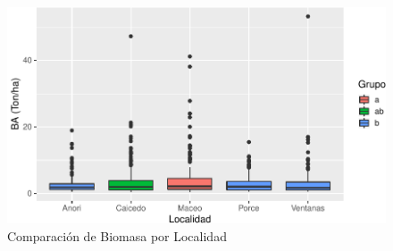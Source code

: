 \documentclass[9pt,onecolumn,twoside,]{pinp}
\begin{document}
\begin{figure}

{\centering \includegraphics{David_Londono_Lopera_Cristian_Ganan_parcial3_files/figure-latex/unnamed-chunk-31-1} 

}

\caption{Comparación de Biomasa por Localidad}\label{fig:unnamed-chunk-31}
\end{figure}


\pnasbreak 
\end{document}
